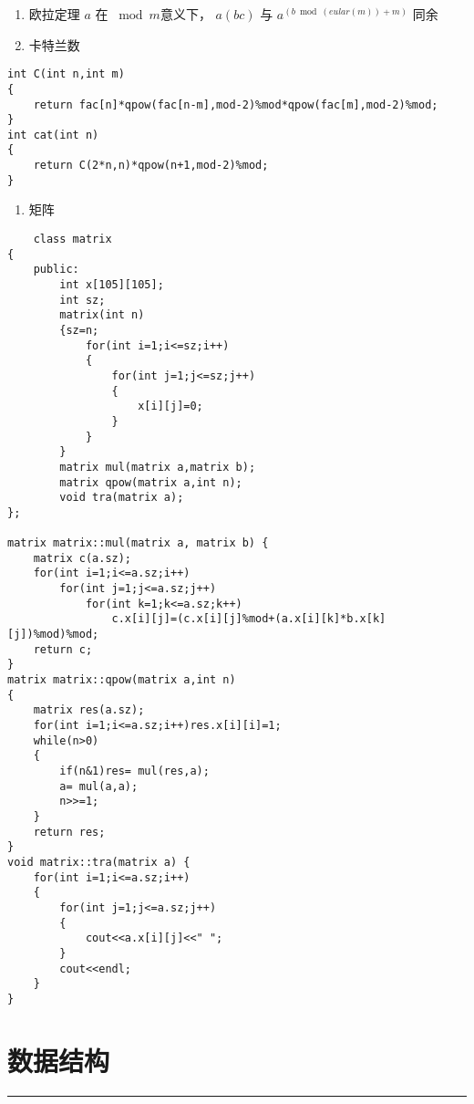\documentclass[]{article}
\providecommand{\tightlist}{%
  \setlength{\itemsep}{0pt}\setlength{\parskip}{0pt}}
\begin{document}
\begin{enumerate}
\def\labelenumi{\arabic{enumi}.}
\setcounter{enumi}{7}
\item
  欧拉定理 \(a\) 在 \(\bmod m\)意义下， \(a(bc)\) 与
  \(a ^ (b \bmod(eular(m))+m)\) 同余
\item
  卡特兰数
\end{enumerate}

\begin{verbatim}
int C(int n,int m)
{
    return fac[n]*qpow(fac[n-m],mod-2)%mod*qpow(fac[m],mod-2)%mod;
}
int cat(int n)
{
    return C(2*n,n)*qpow(n+1,mod-2)%mod;
}
\end{verbatim}

\begin{enumerate}
\def\labelenumi{\arabic{enumi}.}
\setcounter{enumi}{9}
\tightlist
\item
  矩阵
\end{enumerate}

\begin{verbatim}
    class matrix
{
    public:
        int x[105][105];
        int sz;
        matrix(int n)
        {sz=n;
            for(int i=1;i<=sz;i++)
            {
                for(int j=1;j<=sz;j++)
                {
                    x[i][j]=0;
                }
            }
        }
        matrix mul(matrix a,matrix b);
        matrix qpow(matrix a,int n);
        void tra(matrix a);
};

matrix matrix::mul(matrix a, matrix b) {
    matrix c(a.sz);
    for(int i=1;i<=a.sz;i++)
        for(int j=1;j<=a.sz;j++)
            for(int k=1;k<=a.sz;k++)
                c.x[i][j]=(c.x[i][j]%mod+(a.x[i][k]*b.x[k][j])%mod)%mod;
    return c;
}
matrix matrix::qpow(matrix a,int n)
{
    matrix res(a.sz);
    for(int i=1;i<=a.sz;i++)res.x[i][i]=1;
    while(n>0)
    {
        if(n&1)res= mul(res,a);
        a= mul(a,a);
        n>>=1;
    }
    return res;
}
void matrix::tra(matrix a) {
    for(int i=1;i<=a.sz;i++)
    {
        for(int j=1;j<=a.sz;j++)
        {
            cout<<a.x[i][j]<<" ";
        }
        cout<<endl;
    }
}
\end{verbatim}

\hypertarget{ux6570ux636eux7ed3ux6784}{%
\section{数据结构}\label{ux6570ux636eux7ed3ux6784}}

\begin{center}\rule{0.5\linewidth}{0.5pt}\end{center}
\end{document}
